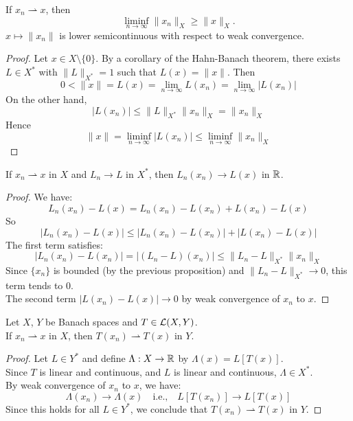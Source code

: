 \begin{theorem}
If $x_n \rightharpoonup x$, then
\[
\liminf_{n \to \infty} \|x_n\|_X \geq \|x\|_X.
\]
$x \mapsto \|x_n\|$ is lower semicontinuous with respect to weak convergence.
\end{theorem}

\begin{proof}
Let $x \in X \setminus \{0\}$. By a corollary of the Hahn-Banach theorem, there exists $L \in X^*$ with $\|L\|_{X^*} = 1$ such that $L(x) = \|x\|$. Then
\[
0 < \|x\| = L(x) = \lim_{n \to \infty} L(x_n) = \lim_{n \to \infty} |L(x_n)|
\]
On the other hand,
\[
|L(x_n)| \leq \|L\|_{X^*} \|x_n\|_X = \|x_n\|_X
\]
Hence
\[
\|x\| = \liminf_{n \to \infty} |L(x_n)| \leq \liminf_{n \to \infty} \|x_n\|_X
\]
\end{proof}

\clearpage

\begin{theorem}
If $x_n \rightharpoonup x$ in $X$ and $L_n \to L$ in $X^*$, then $L_n(x_n) \to L(x)$ in $\mathbb{R}$.
\end{theorem}

\begin{proof}
We have:
\[
L_n(x_n) - L(x) = L_n(x_n) - L(x_n) + L(x_n) - L(x)
\]
So
\[
|L_n(x_n) - L(x)| \leq |L_n(x_n) - L(x_n)| + |L(x_n) - L(x)|
\]
The first term satisfies:
\[
|L_n(x_n) - L(x_n)| = |(L_n - L)(x_n)| \leq \|L_n - L\|_{X^*} \|x_n\|_X
\]
Since $\{x_n\}$ is bounded (by the previous proposition) and $\|L_n - L\|_{X^*} \to 0$, this term tends to 0. \\
The second term $|L(x_n) - L(x)| \to 0$ by weak convergence of $x_n$ to $x$.
\end{proof}

\begin{theorem}
Let $X$, $Y$ be Banach spaces and $T \in \mathcal{L}(X,Y)$. \\
If $x_n \rightharpoonup x$ in $X$, then $T(x_n) \rightharpoonup T(x)$ in $Y$.
\end{theorem}

\begin{proof}
Let $L \in Y^*$ and define $\Lambda: X \to \mathbb{R}$ by $\Lambda(x) = L[T(x)]$. \\
Since $T$ is linear and continuous, and $L$ is linear and continuous, $\Lambda \in X^*$. \\
By weak convergence of $x_n$ to $x$, we have:
\[
\Lambda(x_n) \to \Lambda(x) \quad \text{i.e.,} \quad L[T(x_n)] \to L[T(x)]
\]
Since this holds for all $L \in Y^*$, we conclude that $T(x_n) \rightharpoonup T(x)$ in $Y$.
\end{proof}

